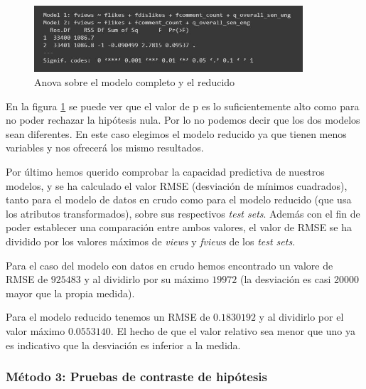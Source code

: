 \documentclass[a4paper,12pt]{article}
\begin{document}
\begin{figure}[h!]
\centering
\includegraphics[width=10cm]{anova_modelos.JPG}
\caption{Anova sobre el modelo completo y el reducido}
\label{fig:anov}
\end{figure}

En la figura \ref{fig:anov} se puede ver que el valor de p es lo suficientemente alto como para no poder rechazar la hip\'otesis nula. Por lo no podemos decir que los dos modelos sean diferentes. En este caso elegimos el modelo reducido ya que tienen menos variables y nos ofrecer\'a los mismo resultados.

Por \'ultimo hemos querido comprobar la capacidad predictiva de nuestros modelos, y se ha calculado el valor RMSE (desviaci\'on de m\'inimos cuadrados), tanto para el modelo de datos en crudo como para el modelo reducido (que usa los atributos transformados), sobre sus respectivos {\itshape test sets}. Adem\'as con el fin de poder establecer una comparaci\'on entre ambos valores, el valor de RMSE se ha dividido por los valores m\'aximos de {\itshape views} y {\itshape fviews} de los {\itshape test sets}.

Para el caso del modelo con datos en crudo hemos encontrado un valore de RMSE de $925483$ y al dividirlo por su m\'aximo $19972$ (la desviaci\'on es casi 20000 mayor que la propia medida). 

Para el modelo reducido tenemos un RMSE de $0.1830192$ y al dividirlo por el valor m\'aximo $0.0553140$. El hecho de que el valor relativo sea menor que uno ya es indicativo que la desviaci\'on es inferior a la medida.  

\subsubsection{M\'etodo 3: Pruebas de contraste de hip\'otesis}
\end{document}
